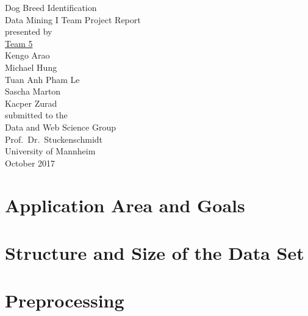\documentclass[11pt,titlepage,oneside,openany]{article}
\begin{document}

\begin{titlepage}
	\vspace*{2cm}
	\begin{center}
		{\huge Dog Breed Identification\\}
		\vspace{2cm} 
		{\large Data Mining I Team Project Report\\}
		\vspace{1.7cm}
		{presented by\\ 
			\vspace{1.0cm} 
			\underline{Team 5} \\
			\vspace{0.5cm} 
			Kengo Arao \\
			Michael Hung \\
			Tuan Anh Pham Le \\
			Sascha Marton \\
			Kacper Zurad \\
		}
		\vspace{1cm} 
		{submitted to the\\
			Data and Web Science Group\\
			Prof.\ Dr.\ Stuckenschmidt\\
			University of Mannheim\\} \vspace{2cm}
		{October 2017}
	\end{center}
\end{titlepage}

\tableofcontents

\newpage


\section{Application Area and Goals}
\label{cha:intro}

\cite{gys07}

\section{Structure and Size of the Data Set}
\label{sec:struc}

\section{Preprocessing}
\label{sec:prep}
\end{document}
